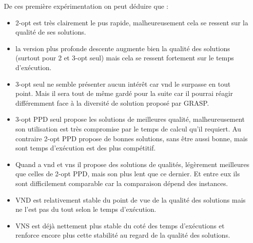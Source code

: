 \documentclass[12pt,a4paper]{article}
\begin{document}
De ces première expérimentation on peut déduire que :
\begin{itemize}
\item
2-opt est très clairement le pus rapide, malheureusement cela se ressent sur la qualité de ses solutions.
\item
la version plus profonde descente augmente bien la qualité des solutions (surtout pour 2 et 3-opt seul) mais cela se ressent fortement sur le temps d’exécution.
\item
3-opt seul ne semble présenter aucun intérêt car vnd le surpasse en tout point. Mais il sera tout de même gardé pour la suite car il pourrai réagir différemment face à la diversité de solution proposé par GRASP.
\item
3-opt PPD seul propose les solutions de meilleures qualité, malheureusement son utilisation est très compromise par le temps de calcul qu'il requiert. Au contraire 2-opt PPD propose de bonnes solutions, sans être aussi bonne, mais sont temps d’exécution est des plus compétitif.
\item
Quand a vnd et vns il propose des solutions de qualités, légèrement meilleures que celles de 2-opt PPD, mais son plus lent que ce dernier. Et entre eux ils sont difficilement comparable car la comparaison dépend des instances.
\item
VND est relativement stable du point de vue de la qualité des solutions mais ne l'est pas du tout selon le temps d’exécution.
\item
VNS est déjà nettement plus stable du coté des temps d’exécutions et renforce encore plus cette stabilité au regard de la qualité des solutions.
\end{itemize}
\end{document}
